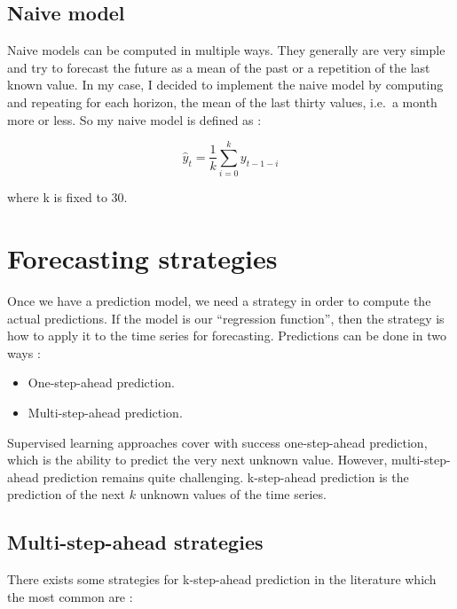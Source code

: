 \documentclass[11pt,a4paper,oneside]{book}
\newenvironment{myitemize}
{ \begin{itemize}
    \setlength\itemsep{0pt}}
{ \end{itemize}                  }
\begin{document}
\subsection{Naive model}

Naive models can be computed in multiple ways. They generally are very simple and try to forecast the future as a mean of the past or a repetition of the last known value. In my case, I decided to implement the naive model by computing and repeating for each horizon, the mean of the last thirty values, i.e.\ a month more or less. So my naive model is defined as : 

\begin{equation}
\hat{y}_t = \frac{1}{k} \sum_{i=0}^{k} y_{t-1-i}
\end{equation}

where k is fixed to 30.


\section{Forecasting strategies}\label{strat}

Once we have a prediction model, we need a strategy in order to compute the actual predictions. If the model is our ``regression function'', then the strategy is how to apply it to the time series for forecasting. Predictions can be done in two ways :

\begin{myitemize}
    \item One-step-ahead prediction.
    \item Multi-step-ahead prediction.
\end{myitemize}

Supervised learning approaches cover with success one-step-ahead prediction, which is the ability to predict the very next unknown value. However, multi-step-ahead prediction remains quite challenging.  k-step-ahead prediction is the prediction of the next $k$ unknown values of the time series. 

\subsection{Multi-step-ahead strategies}

There exists some strategies for k-step-ahead prediction in the literature which the most common are \cite{Bonte}\cite{taiebonte}:
\end{document}
